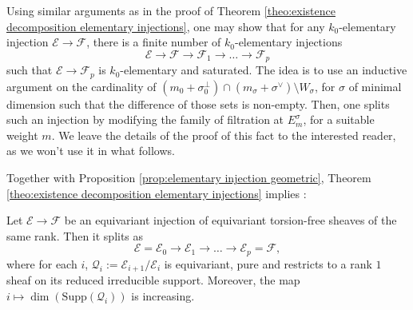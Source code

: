 \documentclass[a4paper,10pt]{amsart}
\theoremstyle{plain}{
    \newtheorem{theorem}{Theorem}[section]
    \newtheorem{lemma}[theorem]{Lemma}
    \newtheorem{corollary}[theorem]{Corollary}
    \newtheorem{proposition}[theorem]{Proposition}
    \newtheorem{conjecture}[theorem]{Conjecture}
}
\theoremstyle{definition}{
    \newtheorem{definition}[theorem]{Definition}
    \newtheorem{defn-thm}[theorem]{Definition-Theorem}
    \newtheorem{example}[theorem]{Example}
    \newtheorem{notation}[theorem]{Notation}
}
\theoremstyle{remark}{
    \newtheorem{remark}[theorem]{Remark}
    \newtheorem{problem}[theorem]{Problem}
    \newtheorem{question}[theorem]{Question}
}
\def\cF{\mathcal{F}}
\def\cE{\mathcal{E}}
\def\cQ{\mathcal{Q}}
\begin{document}
\begin{remark}
 Using similar arguments as in the proof of Theorem \ref{theo:existence decomposition elementary injections}, one may show that for any $k_0$-elementary injection $\cE\to\cF$, there is a finite number of $k_0$-elementary injections 
 $$
 \cE\to\cF\to\cF_1\to\ldots\to\cF_p
 $$
 such that $\cE\to \cF_p$ is $k_0$-elementary and saturated. The idea is to use an inductive argument on the cardinality of $(m_0+\sigma_0^\perp)\cap (m_\sigma+\sigma^\vee)\setminus W_\sigma$, for $\sigma$ of minimal dimension such that the difference of those sets is non-empty. Then, one splits such an injection by modifying the family of filtration at $E^\sigma_m$, for a suitable weight $m$. We leave the details of the proof of this fact to the interested reader, as we won't use it in what follows.
\end{remark}

Together with Proposition \ref{prop:elementary injection geometric}, Theorem \ref{theo:existence decomposition elementary injections} implies :
\begin{corollary}
\label{cor:splitting geometric}
 Let $\cE\to\cF$ be an equivariant injection of equivariant torsion-free sheaves of the same rank. Then it splits as 
 $$
 \cE=\cE_0\to\cE_1\to \ldots\to\cE_p=\cF,
 $$
 where for each $i$, $\cQ_i:=\cE_{i+1}/\cE_i$ is equivariant, pure and restricts to a rank $1$ sheaf on its reduced irreducible support. Moreover, the map $i\mapsto \dim(\mathrm{Supp}(\cQ_i))$ is increasing.
\end{corollary}
\end{document}
